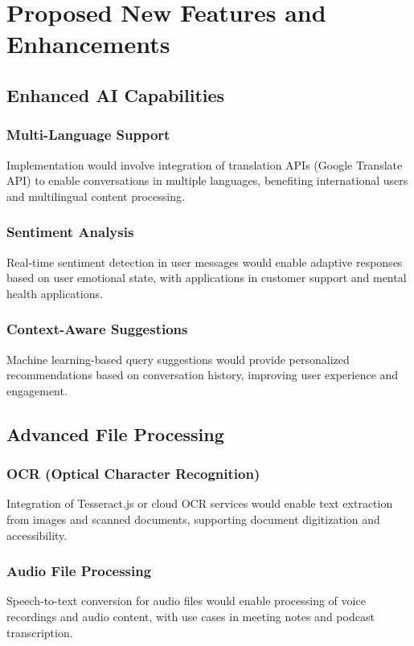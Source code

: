 \documentclass[conference]{IEEEtran}
\begin{document}
\section{Proposed New Features and Enhancements}

\subsection{Enhanced AI Capabilities}

\subsubsection{Multi-Language Support}
Implementation would involve integration of translation APIs (Google Translate API) to enable conversations in multiple languages, benefiting international users and multilingual content processing.

\subsubsection{Sentiment Analysis}
Real-time sentiment detection in user messages would enable adaptive responses based on user emotional state, with applications in customer support and mental health applications.

\subsubsection{Context-Aware Suggestions}
Machine learning-based query suggestions would provide personalized recommendations based on conversation history, improving user experience and engagement.

\subsection{Advanced File Processing}

\subsubsection{OCR (Optical Character Recognition)}
Integration of Tesseract.js or cloud OCR services would enable text extraction from images and scanned documents, supporting document digitization and accessibility.

\subsubsection{Audio File Processing}
Speech-to-text conversion for audio files would enable processing of voice recordings and audio content, with use cases in meeting notes and podcast transcription.
\end{document}
